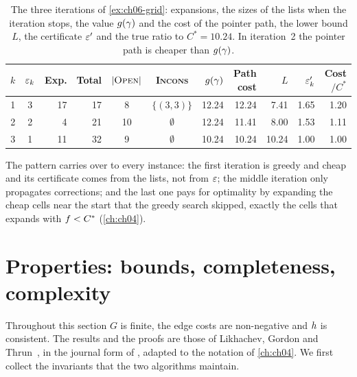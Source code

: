 \begin{table}[tb]
  \centering\small
  \caption{The three iterations of \cref{ex:ch06-grid}: expansions, the
  sizes of the lists when the iteration stops, the value $g(\gamma)$ and
  the cost of the pointer path, the lower bound $L$, the certificate $\varepsilon'$
  and the true ratio to $C^* = 10.24$. In iteration~2 the pointer path is
  cheaper than $g(\gamma)$.}
  \label{tab:ch06-iterations}
  \begin{tabular}{@{}ccrrccrrrrr@{}}
  \toprule
  $k$ & $\varepsilon_k$ & Exp. & Total & $\left\lvert \text{\textsc{Open}} \right\rvert$ & \textsc{Incons} & $g(\gamma)$ & Path cost & $L$ & $\varepsilon'_k$ & Cost$/C^*$\\
  \midrule
  1 & 3 & 17 & 17 &  8 & $\{(3,3)\}$ & 12.24 & 12.24 &  7.41 & 1.65 & 1.20\\
  2 & 2 &  4 & 21 & 10 & $\emptyset$ & 12.24 & 11.41 &  8.00 & 1.53 & 1.11\\
  3 & 1 & 11 & 32 &  9 & $\emptyset$ & 10.24 & 10.24 & 10.24 & 1.00 & 1.00\\
  \bottomrule
  \end{tabular}
\end{table}

The pattern carries over to every instance: the first iteration is greedy and
cheap and its certificate comes from the lists, not from $\varepsilon$; the middle
iteration only propagates corrections; and the last one pays for optimality by
expanding the cheap cells near the start that the greedy search skipped,
exactly the cells that \astar expands with $f < C^*$ (\cref{ch:ch04}).

\section{Properties: bounds, completeness, complexity}
\label{sec:ch06-properties}

Throughout this section $G$ is finite, the edge costs are non-negative and
$h$ is consistent. The results and the proofs are those of Likhachev,
Gordon and Thrun~\cite{likhachev2003ara}, in the journal form of
\cite{likhachev2008anytime}, adapted to the notation of \cref{ch:ch04}. We
first collect the invariants that the two algorithms maintain.

